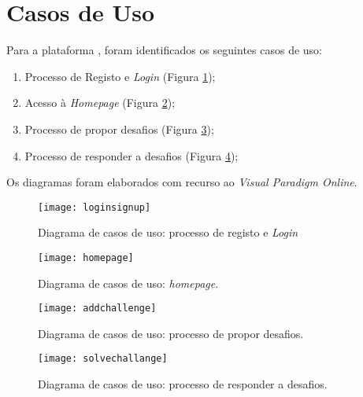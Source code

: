 \section{Casos de Uso}
\label{sec::engsoft:casos-uso}

Para a plataforma \appname, foram identificados os seguintes casos de uso:
\begin{enumerate}%
    \item Processo de Registo e \emph{Login} (Figura \ref{fig::casos-uso-regis});
    \item Acesso à \textit{Homepage} (Figura \ref{fig::casos-uso-homepage});
    \item Processo de propor desafios (Figura \ref{fig::casos-uso-propdesafio});
    \item Processo de responder a desafios (Figura \ref{fig::casos-uso-repdesafio});
\end{enumerate}

Os diagramas foram elaborados com recurso ao \textit{Visual Paradigm Online}.

\begin{figure}[!htbp]
    \centering
    \texttt{[image: loginsignup]}	\caption[Diagrama de casos de uso: processo de registo e \emph{Login}]{Diagrama de casos de uso: processo de registo e \emph{Login}}
    \label{fig::casos-uso-regis}
\end{figure}

\begin{figure}[!htbp]
    \centering
    \texttt{[image: homepage]}
    \caption[Diagrama de casos de uso: \emph{homepage}]{Diagrama de casos de uso: \emph{homepage}.}
    \label{fig::casos-uso-homepage}
\end{figure}

\begin{figure}[!htbp]
    \centering
    \texttt{[image: addchallenge]}
    \caption[Diagrama de casos de uso: processo de propor desafios]{Diagrama de casos de uso: processo de propor desafios.}
    \label{fig::casos-uso-propdesafio}
\end{figure}

\begin{figure}[!htbp]
    \centering
    \texttt{[image: solvechallange]}
    \caption[Diagrama de casos de uso: processo de responder a desafios]{Diagrama de casos de uso: processo de responder a desafios.}
    \label{fig::casos-uso-repdesafio}
\end{figure}



